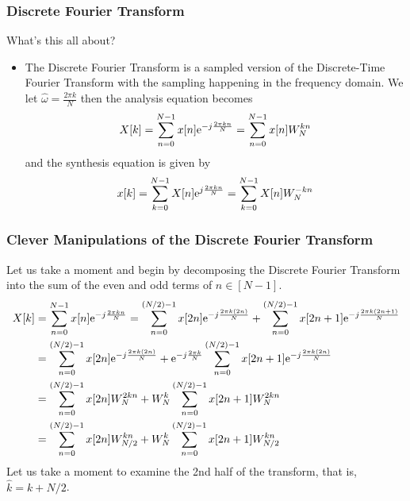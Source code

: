 \documentclass[mathserif,9pt,handout]{beamer}
\begin{document}
\begin{frame}\frametitle{Discrete Fourier Transform}\small
  \begin{block}{What's this all about?}
    \begin{itemize}
      \item The Discrete Fourier Transform is a sampled version of the Discrete-Time Fourier Transform with the sampling happening in the frequency domain. We let $\hat{\omega}=\frac{2\pi k}{N}$ then the analysis equation becomes
        \begin{align}
          X[k] = \sum_{n=0}^{N-1} x[n] {\textrm{e}}^{-j\frac{2\pi k n}{N}} = \sum_{n=0}^{N-1} x[n] W_N^{kn} \nonumber
        \end{align}
        and the synthesis equation is given by 
        \begin{align}
          x[k] = \sum_{k=0}^{N-1} X[n] {\textrm{e}}^{j\frac{2\pi k n}{N}} = \sum_{k=0}^{N-1} X[n] W_N^{-kn} \nonumber
        \end{align}
    \end{itemize}
  \end{block}
\end{frame}


\begin{frame}\frametitle{Clever Manipulations of the Discrete Fourier Transform}\small
  Let us take a moment and begin by decomposing the Discrete Fourier Transform into the sum of the even and odd terms of $n \in [N-1]$.
  \begin{align}
    X[k] &= \sum_{n=0}^{N-1} x[n] {\textrm{e}}^{-j\frac{2\pi k n}{N}} = \sum_{n=0}^{(N/2)-1} x[2n] {\textrm{e}}^{-j\frac{2\pi k (2n)}{N}} + \sum_{n=0}^{(N/2)-1} x[2n+1] {\textrm{e}}^{-j\frac{2\pi k (2n+1)}{N}} \nonumber \\
    &= \sum_{n=0}^{(N/2)-1} x[2n] {\textrm{e}}^{-j\frac{2\pi k (2n)}{N}} + {\textrm{e}}^{-j\frac{2\pi k}{N}} \sum_{n=0}^{(N/2)-1} x[2n+1] {\textrm{e}}^{-j\frac{2\pi k (2n)}{N}}  \nonumber \\
    &= \sum_{n=0}^{(N/2)-1} x[2n] W_N^{2kn} + W_N^{k} \sum_{n=0}^{(N/2)-1} x[2n+1] W_N^{2kn} \nonumber \\
    &= \sum_{n=0}^{(N/2)-1} x[2n] W_{N/2}^{kn} + W_N^{k} \sum_{n=0}^{(N/2)-1} x[2n+1] W_{N/2}^{kn} \nonumber 
  \end{align}
  Let us take a moment to examine the 2nd half of the transform, that is, $\hat{k} = k +N/2$.
\end{frame}
\end{document}
